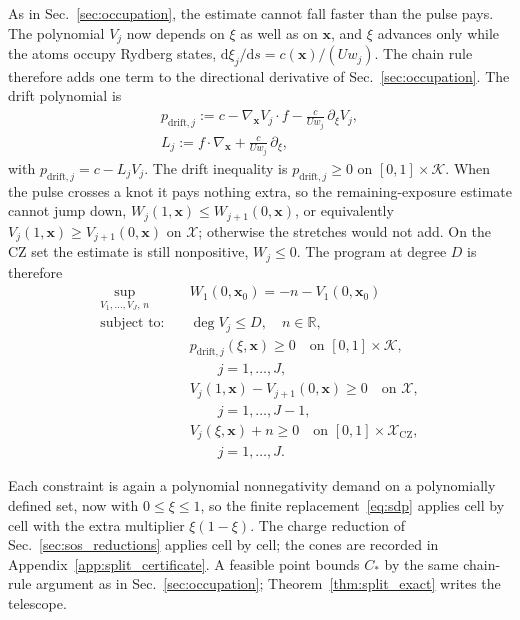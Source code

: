 \documentclass[aps,prx,reprint,nofootinbib,longbibliography,floatfix]{revtex4-2}
\theoremstyle{plain}
\theoremstyle{remark}
\newcommand{\dd}{\mathrm{d}}
\newcommand{\xv}{\boldsymbol{x}}
\begin{document}
As in Sec.~\ref{sec:occupation}, the estimate cannot fall faster than
the pulse pays. The polynomial $V_j$ now depends on $\xi$ as well as on
$\xv$, and $\xi$ advances only while the atoms occupy Rydberg states,
$\dd\xi_j/\dd s=c(\xv)/(Uw_j)$. The chain rule therefore adds one term to
the directional derivative of Sec.~\ref{sec:occupation}. The drift
polynomial is
\begin{equation}
\begin{gathered}
p_{\mathrm{drift},j}
:=c-\nabla_{\xv} V_j\cdot f-\frac{c}{Uw_j}\,\partial_\xi V_j,\\
L_j:=f\cdot\nabla_{\xv}+\frac{c}{Uw_j}\,\partial_\xi,
\end{gathered}
\label{eq:split_generator_mass}
\end{equation}
with $p_{\mathrm{drift},j}=c-L_jV_j$. The drift inequality is
$p_{\mathrm{drift},j}\ge0$ on $[0,1]\times\mathcal K$. When the pulse
crosses a knot it pays nothing extra, so the remaining-exposure
estimate cannot jump down, $W_j(1,\xv)\le W_{j+1}(0,\xv)$, or equivalently
$V_j(1,\xv)\ge V_{j+1}(0,\xv)$ on $\mathcal{X}$; otherwise the stretches
would not add. On the CZ set the estimate is still nonpositive,
$W_j\le0$. The program at degree $D$ is therefore
\begin{equation}
\begin{aligned}
\sup_{V_1,\dots,V_J,\,n}
& \quad W_1(0,\xv_0)=-n-V_1(0,\xv_0) \\
\text{subject to:}
& \quad \deg V_j\le D,\quad n\in\mathbb{R}, \\
& \quad p_{\mathrm{drift},j}(\xi,\xv)\ge0
\quad\text{on }[0,1]\times\mathcal K,\\
& \quad\qquad j=1,\dots,J, \\
& \quad V_j(1,\xv)-V_{j+1}(0,\xv)\ge0
\quad\text{on }\mathcal{X},\\
& \quad\qquad j=1,\dots,J-1, \\
& \quad V_j(\xi,\xv)+n\ge0
\quad\text{on }[0,1]\times\mathcal{X}_{\mathrm{CZ}},\\
& \quad\qquad j=1,\dots,J.
\end{aligned}
\label{eq:split_pop}
\end{equation}

Each constraint is again a polynomial nonnegativity demand on a polynomially
defined set, now with $0\le\xi\le1$, so the finite replacement~\eqref{eq:sdp}
applies cell by cell with the extra multiplier $\xi(1-\xi)$. The charge
reduction of Sec.~\ref{sec:sos_reductions} applies cell by cell; the cones
are recorded in Appendix~\ref{app:split_certificate}. A feasible point bounds
$C_*$ by the same chain-rule argument as in Sec.~\ref{sec:occupation};
Theorem~\ref{thm:split_exact} writes the telescope.
\end{document}
